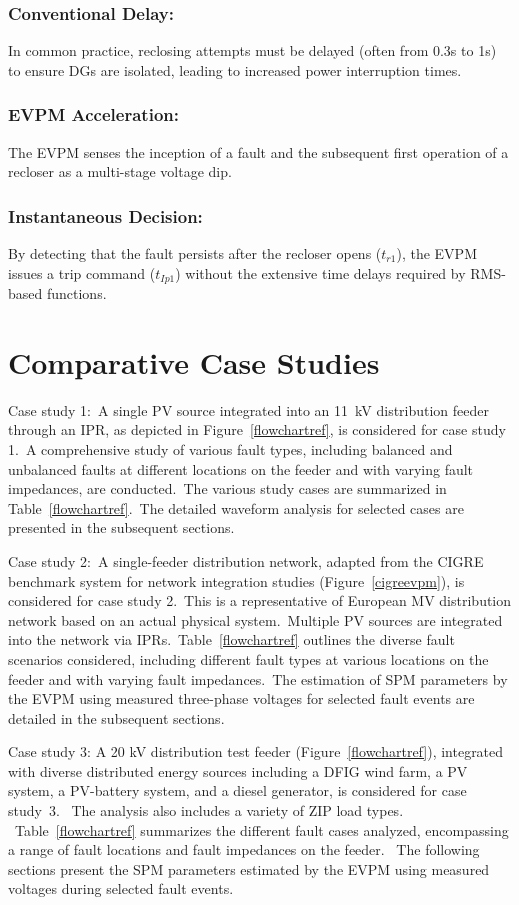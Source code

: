 \subsubsection{Conventional Delay:}
In common practice, reclosing attempts must be delayed (often from 0.3s to 1s) to ensure DGs are isolated, leading to increased power interruption times.
\subsubsection{EVPM Acceleration:}
The EVPM senses the inception of a fault and the subsequent first operation of a recloser as a multi-stage voltage dip.
\subsubsection{Instantaneous Decision:}
By detecting that the fault persists after the recloser opens ($t_{r1}$), the EVPM issues a trip command ($t_{Ip1}$) without the extensive time delays required by RMS-based functions.

\section{Comparative Case Studies}

Case study 1:~A single PV source integrated into an 11~kV distribution feeder through an IPR, as depicted in Figure~\ref{flowchartref}, is considered for case study 1.~A comprehensive study of various fault types, including balanced and unbalanced faults at different locations on the feeder and with varying fault impedances, are conducted.~The various study cases are summarized in Table~\ref{flowchartref}.~The detailed waveform analysis for selected cases are presented in the subsequent sections.

Case study 2:~A single-feeder distribution network, adapted from the CIGRE benchmark system for network integration studies (Figure~\ref{cigreevpm}), is considered for case study 2.~This is a representative of European MV distribution network based on an actual physical system.~Multiple PV sources are integrated into the network via IPRs.~Table~\ref{flowchartref} outlines the diverse fault scenarios considered, including different fault types at various locations on the feeder and with varying fault impedances.~The estimation of SPM parameters by the EVPM using measured three-phase voltages for selected fault events are detailed in the subsequent sections.

Case study 3: A 20 kV distribution test feeder (Figure~\ref{flowchartref}), integrated with diverse distributed energy sources including a DFIG wind farm, a PV system, a PV-battery system, and a diesel generator, is considered for case study~3. ~The analysis also includes a variety of ZIP load types. ~Table~\ref{flowchartref} summarizes the different fault cases analyzed, encompassing a range of fault locations and fault impedances on the feeder. ~The following sections present the SPM parameters estimated by the EVPM using measured voltages during selected fault events.

